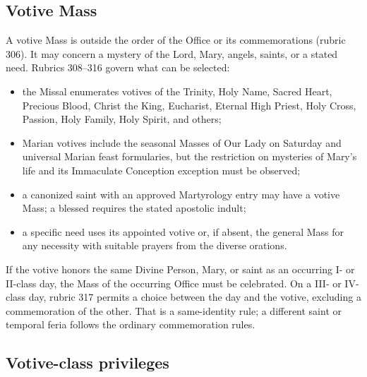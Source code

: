\subsection{Votive Mass}

A votive Mass is outside the order of the Office or its commemorations (rubric 306). It may concern a mystery of the Lord, Mary, angels, saints, or a stated need. Rubrics 308--316 govern what can be selected:

\begin{itemize}
\item the Missal enumerates votives of the Trinity, Holy Name, Sacred Heart, Precious Blood, Christ the King, Eucharist, Eternal High Priest, Holy Cross, Passion, Holy Family, Holy Spirit, and others;
\item Marian votives include the seasonal Masses of Our Lady on Saturday and universal Marian feast formularies, but the restriction on mysteries of Mary's life and its Immaculate Conception exception must be observed;
\item a canonized saint with an approved Martyrology entry may have a votive Mass; a blessed requires the stated apostolic indult;
\item a specific need uses its appointed votive or, if absent, the general Mass for any necessity with suitable prayers from the diverse orations.
\end{itemize}

If the votive honors the same Divine Person, Mary, or saint as an occurring I- or II-class day, the Mass of the occurring Office must be celebrated. On a III- or IV-class day, rubric 317 permits a choice between the day and the votive, excluding a commemoration of the other. That is a same-identity rule; a different saint or temporal feria follows the ordinary commemoration rules.

\subsection{Votive-class privileges}

